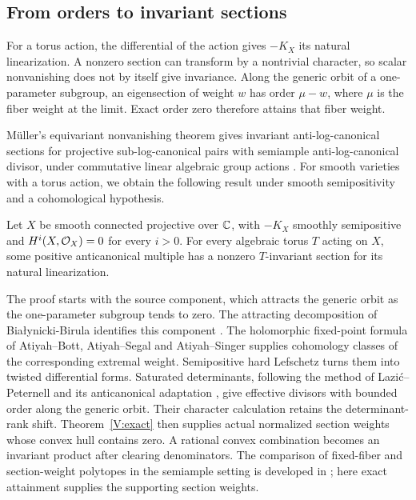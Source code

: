 \subsection{From orders to invariant sections}
For a torus action, the differential of the action gives $-K_X$ its
natural linearization.  A nonzero section can transform by a nontrivial
character, so scalar nonvanishing does not by itself give invariance.
Along the generic orbit of a one-parameter subgroup, an eigensection
of weight $w$ has order $\mu-w$, where $\mu$ is the fiber weight at
the limit.  Exact order zero therefore attains that fiber weight.

M\"uller's equivariant nonvanishing theorem gives invariant
anti-log-canonical sections for projective sub-log-canonical pairs
with semiample anti-log-canonical divisor, under commutative linear
algebraic group actions \cite[Theorem~C]{Muller2025}.  For smooth
varieties with a torus action, we obtain the following result under
smooth semipositivity and a cohomological hypothesis.

\begin{theorem}\label{V:invariant-main}
Let $X$ be smooth connected projective over $\mathbb C$, with $-K_X$ smoothly
semipositive and $H^i(X,\mathcal O_X)=0$ for every $i>0$. For every algebraic
torus $T$ acting on $X$, some positive anticanonical multiple has a
nonzero $T$-invariant section for its natural linearization.
\end{theorem}

The proof starts with the source component, which attracts the generic
orbit as the one-parameter subgroup tends to zero.  The attracting
decomposition of Bia\l ynicki-Birula identifies this component
\cite{BB1973}.  The holomorphic fixed-point formula of Atiyah--Bott,
Atiyah--Segal and Atiyah--Singer
\cite{AtiyahBott1968,AtiyahSegal1968,AtiyahSinger1968} supplies
cohomology classes of the corresponding extremal weight.  Semipositive
hard Lefschetz \cite[Theorem~0.1]{DPS2001} turns them into twisted
differential forms.  Saturated determinants, following the method of
Lazi\'c--Peternell \cite[Lemma~4.1]{LP2018} and its anticanonical
adaptation \cite[Lemma~5.1]{LMPTX2023}, give effective
divisors with bounded order along the generic orbit.  Their character
calculation retains the determinant-rank shift.  Theorem~\ref{V:exact}
then supplies actual normalized section weights whose convex hull
contains zero.  A rational convex combination becomes
an invariant product after clearing denominators.  The comparison of
fixed-fiber and section-weight polytopes in the semiample setting is
developed in \cite[Proposition~3.13 and Corollary~3.14]{Muller2025};
here exact attainment supplies the supporting section weights.

